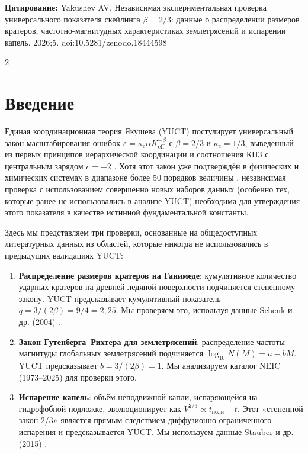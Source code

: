 \documentclass[11pt,a4paper]{article}
\newcommand{\eps}{\varepsilon}
\newcommand{\kappac}{\kappa_c}
\newcommand{\Keff}{K_{\mathrm{eff}}}
\newcommand{\betaf}{\beta}
\begin{document}
	\vspace{0.1cm}
	\noindent
	{\color{darkblue}\textbf{Цитирование:}} Yakushev AV. Независимая экспериментальная проверка универсального показателя скейлинга \(\beta = 2/3\): данные о распределении размеров кратеров, частотно-магнитудных характеристиках землетрясений и испарении капель. 2026;5. doi:10.5281/zenodo.18444598
	
	\vspace{0.4cm}
	\vspace*{-\baselineskip}
	\begin{multicols}{2}
		
		\section{Введение}
		
		Единая координационная теория Якушева (YUCT) постулирует универсальный закон масштабирования ошибок \(\eps = \kappac \alpha \Keff^{-\betaf}\) с \(\betaf = 2/3\) и \(\kappac = 1/3\), выведенный из первых принципов иерархической координации и соотношения КПЗ с центральным зарядом \(c = -2\) \cite{AppendixY, AppendixL}. Хотя этот закон уже подтверждён в физических и химических системах в диапазоне более 50 порядков величины \cite{AppendixC, AppendixG}, независимая проверка с использованием совершенно новых наборов данных (особенно тех, которые ранее не использовались в анализе YUCT) необходима для утверждения этого показателя в качестве истинной фундаментальной константы.
		
		Здесь мы представляем три проверки, основанные на общедоступных литературных данных из областей, которые никогда не использовались в предыдущих валидациях YUCT:
		
		\begin{enumerate}
			\item \textbf{Распределение размеров кратеров на Ганимеде}: кумулятивное количество ударных кратеров на древней ледяной поверхности подчиняется степенному закону. YUCT предсказывает кумулятивный показатель \(q = 3/(2\betaf) = 9/4 = 2,25\). Мы проверяем это, используя данные Schenk и др. (2004) \cite{Schenk2004}.
			\item \textbf{Закон Гутенберга–Рихтера для землетрясений}: распределение частоты–магнитуды глобальных землетрясений подчиняется \(\log_{10} N(M) = a - bM\). YUCT предсказывает \(b = 3/(2\betaf) = 1\). Мы анализируем каталог NEIC (1973–2025) \cite{USGSNEIC} для проверки этого.
			\item \textbf{Испарение капель}: объём неподвижной капли, испаряющейся на гидрофобной подложке, эволюционирует как \(V^{2/3} \propto t_{\text{полн}} - t\). Этот «степенной закон 2/3» является прямым следствием диффузионно-ограниченного испарения и предсказывается YUCT. Мы используем данные Stauber и др. (2015) \cite{Stauber2015}.
		\end{enumerate}
		

\end{multicols}
\end{document}
